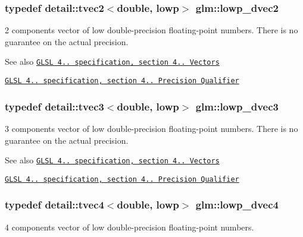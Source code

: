 \subsubsection[{\texorpdfstring{lowp\+\_\+dvec2}{lowp_dvec2}}]{\setlength{\rightskip}{0pt plus 5cm}typedef detail\+::tvec2$<$double, lowp$>$ {\bf glm\+::lowp\+\_\+dvec2}}\hypertarget{group__core__precision_ga27a115a27d5f065e8c043f57191d583b}{}\label{group__core__precision_ga27a115a27d5f065e8c043f57191d583b}
2 components vector of low double-\/precision floating-\/point numbers. There is no guarantee on the actual precision.

\begin{DoxySeeAlso}{See also}
\href{http://www.opengl.org/registry/doc/GLSLangSpec.4.20.8.pdf}{\tt G\+L\+SL 4.. specification, section 4.. Vectors} 

\href{http://www.opengl.org/registry/doc/GLSLangSpec.4.20.8.pdf}{\tt G\+L\+SL 4.. specification, section 4.. Precision Qualifier} 
\end{DoxySeeAlso}
\subsubsection[{\texorpdfstring{lowp\+\_\+dvec3}{lowp_dvec3}}]{\setlength{\rightskip}{0pt plus 5cm}typedef detail\+::tvec3$<$double, lowp$>$ {\bf glm\+::lowp\+\_\+dvec3}}\hypertarget{group__core__precision_ga9bdb864f7242863e1227e3209f5b2dc4}{}\label{group__core__precision_ga9bdb864f7242863e1227e3209f5b2dc4}
3 components vector of low double-\/precision floating-\/point numbers. There is no guarantee on the actual precision.

\begin{DoxySeeAlso}{See also}
\href{http://www.opengl.org/registry/doc/GLSLangSpec.4.20.8.pdf}{\tt G\+L\+SL 4.. specification, section 4.. Vectors} 

\href{http://www.opengl.org/registry/doc/GLSLangSpec.4.20.8.pdf}{\tt G\+L\+SL 4.. specification, section 4.. Precision Qualifier} 
\end{DoxySeeAlso}
\subsubsection[{\texorpdfstring{lowp\+\_\+dvec4}{lowp_dvec4}}]{\setlength{\rightskip}{0pt plus 5cm}typedef detail\+::tvec4$<$double, lowp$>$ {\bf glm\+::lowp\+\_\+dvec4}}\hypertarget{group__core__precision_gad04432e5d5accf764e10c6674e5d0c96}{}\label{group__core__precision_gad04432e5d5accf764e10c6674e5d0c96}
4 components vector of low double-\/precision floating-\/point numbers.

